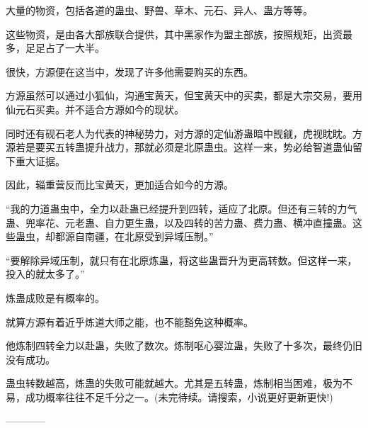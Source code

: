 \begin{this_body}
大量的物资，包括各道的蛊虫、野兽、草木、元石、异人、蛊方等等。

这些物资，是由各大部族联合提供，其中黑家作为盟主部族，按照规矩，出资最多，足足占了一大半。

很快，方源便在这当中，发现了许多他需要购买的东西。

方源虽然可以通过小狐仙，沟通宝黄天，但宝黄天中的买卖，都是大宗交易，要用仙元石买卖。并不适合方源如今的现状。

同时还有砚石老人为代表的神秘势力，对方源的定仙游蛊暗中觊觎，虎视眈眈。方源若是要买五转蛊提升战力，那就必须是北原蛊虫。这样一来，势必给智道蛊仙留下重大证据。

因此，辎重营反而比宝黄天，更加适合如今的方源。

“我的力道蛊虫中，全力以赴蛊已经提升到四转，适应了北原。但还有三转的力气蛊、兜率花、元老蛊、自力更生蛊，以及四转的苦力蛊、费力蛊、横冲直撞蛊。这些蛊虫，却都源自南疆，在北原受到异域压制。”

“要解除异域压制，就只有在北原炼蛊，将这些蛊晋升为更高转数。但这样一来，投入的就太多了。”

炼蛊成败是有概率的。

就算方源有着近乎炼道大师之能，也不能豁免这种概率。

他炼制四转全力以赴蛊，失败了数次。炼制呕心婴泣蛊，失败了十多次，最终仍旧没有成功。

蛊虫转数越高，炼蛊的失败可能就越大。尤其是五转蛊，炼制相当困难，极为不易，成功概率往往不足千分之一。(未完待续。请搜索，小说更好更新更快!)

------------

\end{this_body}

